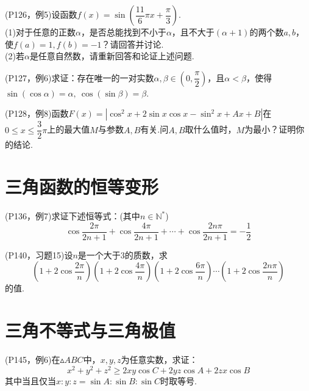 \documentclass[cn,hazy,black,10pt,normal]{elegantnote}
\newcommand{\ssb}[1]{\left( #1 \right)}
\begin{document}
\newpage
\begin{problem}
	(P126，例5)设函数$f(x)=\sin \ssb{\dfrac{11}{6} \pi x + \dfrac{\pi}{3}}$. \\
	(1)对于任意的正数$\alpha$，是否总能找到不小于$\alpha$，且不大于$(\alpha +1)$的两个数$a,b$，使$f(a)=1,f(b)=-1$？请回答并讨论. \\
	(2)若$\alpha$是任意自然数，请重新回答和论证上述问题.
\end{problem}

\newpage
\begin{problem}
	(P127，例6)求证：存在唯一的一对实数$\alpha ,\beta \in \ssb{0,\dfrac{\pi}{2}}$，且$\alpha < \beta$，使得$\sin (\cos \alpha) = \alpha ,~\cos (\sin \beta ) = \beta$.
\end{problem}

\vspace{27em}

\begin{problem}
	(P128，例8)函数$F(x)=|\cos ^2 x + 2\sin x \cos x - \sin ^2 x + Ax+B|$在$0 \leq x \leq \dfrac{3}{2}\pi$上的最大值$M$与参数$A,B$有关.问$A,B$取什么值时，$M$为最小？证明你的结论.
\end{problem}

\newpage
\section{三角函数的恒等变形}

\begin{problem}
	(P136，例7)求证下述恒等式：(其中$n \in \mathbb{N}^{*}$)$$\cos \frac{2\pi}{2n+1} + \cos \frac{4\pi}{2n+1} + \cdots + \cos \frac{2n\pi}{2n+1} = -\frac{1}{2}$$
\end{problem}

\vspace{23em}

\begin{problem}
	(P140，习题15)设$n$是一个大于$3$的质数，求$$\ssb{1+2\cos \frac{2\pi}{n}} \ssb{1+2\cos \frac{4\pi}{n}} \ssb{1+2\cos \frac{6\pi}{n}} \cdots \ssb{1+2\cos \frac{2n\pi}{n}}$$
	的值.
\end{problem}

\newpage
\section{三角不等式与三角极值}

\begin{problem}
	(P145，例6)在$\vartriangle ABC$中，$x,y,z$为任意实数，求证：$$x^2+y^2+z^2 \geq 2xy\cos C + 2yz\cos A + 2zx \cos B$$
	其中当且仅当$x:y:z=\sin A : \sin B : \sin C$时取等号.
\end{problem}
\end{document}

